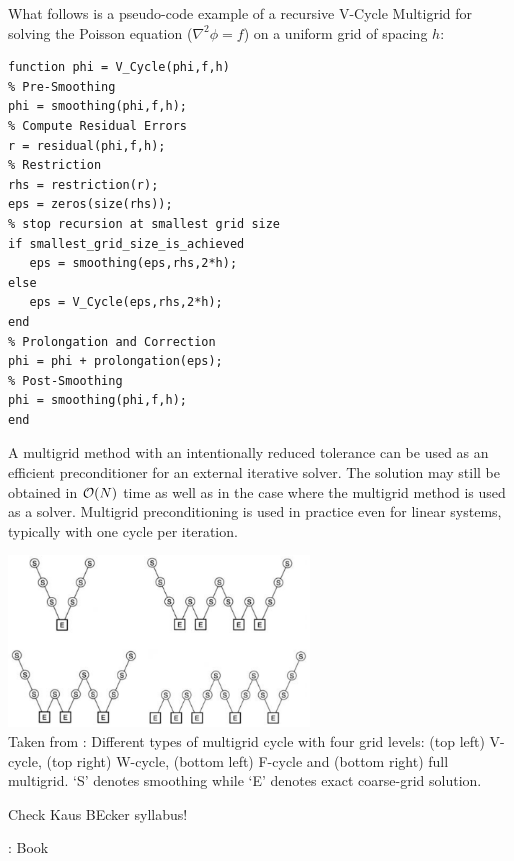 What follows is a pseudo-code example of a recursive V-Cycle Multigrid for solving 
the Poisson equation ($\nabla^2 \phi = f$) 
on a uniform grid of spacing $h$:

\begin{verbatim}
function phi = V_Cycle(phi,f,h)
% Pre-Smoothing
phi = smoothing(phi,f,h);
% Compute Residual Errors
r = residual(phi,f,h);
% Restriction
rhs = restriction(r);
eps = zeros(size(rhs));
% stop recursion at smallest grid size
if smallest_grid_size_is_achieved
   eps = smoothing(eps,rhs,2*h);
else        
   eps = V_Cycle(eps,rhs,2*h);        
end
% Prolongation and Correction
phi = phi + prolongation(eps);
% Post-Smoothing
phi = smoothing(phi,f,h);    
end
\end{verbatim}

A multigrid method with an intentionally reduced tolerance can be used as an efficient preconditioner for an external iterative solver. The solution may still be obtained in ${\cal O}(N)$ time as well as in the case where the multigrid method is used as a solver. Multigrid preconditioning is used in practice even for linear systems, typically with one cycle per iteration.

\begin{center}
\includegraphics[width=8cm]{images/multigrid/cycles}\\
{\scriptsize Taken from \cite{tack10}: Different types of multigrid cycle with four grid levels: (top left) V-cycle, (top right) W-cycle,
(bottom left) F-cycle and (bottom right) full multigrid. ‘S’ denotes smoothing while ‘E’ denotes
exact coarse-grid solution.}
\end{center} 

Check Kaus BEcker syllabus!

\Literature: \cite{pisa85,lils89,tack10,gery10,mabl15,lopp14,tros01,moma05,yaba00,teeb18,yavn06,clhk19} Book \cite{brmc00}
